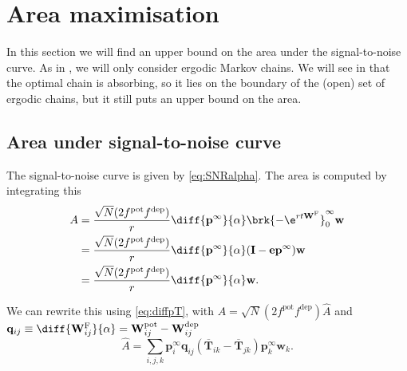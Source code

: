 \documentclass{article} %
\DeclareMathOperator{\SNR}{SNR}
\newcommand{\I}{\mathbf{I}}
\newcommand{\onev}{\mathbf{e}}
\newcommand{\pr}{\mathbf{p}}
\newcommand{\eq}{\pr^\infty}
\newcommand{\fpt}{\mathbf{T}}
\newcommand{\fptb}{\overline{\fpt}}
\newcommand{\w}{\mathbf{w}}
\newcommand{\W}{\mathbf{W}}
\newcommand{\enc}{\mathbf{q}}
\newcommand{\frg}{\W^{\mathrm{F}}}
\newcommand{\pot}{^{\text{pot}}}
\newcommand{\dep}{^{\text{dep}}}
\begin{document}
\section{Area maximisation}\label{sec:areamax}

In this section we will find an upper bound on the area under the signal-to-noise curve.
As in , we will only consider ergodic Markov chains.
We will see in  that the optimal chain is absorbing, so it lies on the boundary of the (open) set of ergodic chains, but it still puts an upper bound on the area.

\subsection{Area under signal-to-noise curve}\label{sec:area}

The signal-to-noise curve is given by \eqref{eq:SNRalpha}.
The area is computed by integrating this
%
\begin{equation}\label{eq:area}
\begin{aligned}
  A &= \frac{\sqrt{N}(2f\pot f\dep )}{r} \diff{\eq}{\alpha} \brk{-\e^{rt\frg}}_0^\infty \w \\
    &= \frac{\sqrt{N}(2f\pot f\dep )}{r} \diff{\eq}{\alpha} (\I-\onev\eq) \w \\
    &= \frac{\sqrt{N}(2f\pot f\dep )}{r} \diff{\eq}{\alpha} \w.
\end{aligned}
\end{equation}
%

We can rewrite this using \eqref{eq:diffpT}, with $A=\sqrt{N}(2f\pot f\dep )\hat{A}$ and $\enc_{ij} \equiv \diff{\frg_{ij}}{\alpha}=\W\pot _{ij}-\W\dep _{ij}$
%
\begin{equation}\label{eq:areaT}
  \hat{A} = \sum_{i,j,k} \eq_i \enc_{ij} (\fptb_{ik} - \fptb_{jk}) \eq_k \w_k.
\end{equation}
%
\end{document}
